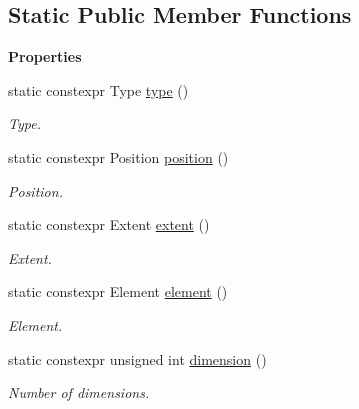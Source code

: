 \subsection*{Static Public Member Functions}
\begin{Indent}{\bf Properties}\par
\begin{DoxyCompactItemize}
\item 
static constexpr Type \hyperlink{exceptionmagrathea_1_1SimpleHyperOctree_a6271ece62c25a4686aedecf0d237df7c}{type} ()
\begin{DoxyCompactList}\small\item\em Type. \end{DoxyCompactList}\item 
static constexpr Position \hyperlink{exceptionmagrathea_1_1SimpleHyperOctree_abe69b54c6a57c71a0b2af0a30027d1a4}{position} ()
\begin{DoxyCompactList}\small\item\em Position. \end{DoxyCompactList}\item 
static constexpr Extent \hyperlink{exceptionmagrathea_1_1SimpleHyperOctree_a626638d67638d26ba680c0452af7c868}{extent} ()
\begin{DoxyCompactList}\small\item\em Extent. \end{DoxyCompactList}\item 
static constexpr Element \hyperlink{exceptionmagrathea_1_1SimpleHyperOctree_aca02f6d7250f58d2da225a11d6a4c197}{element} ()
\begin{DoxyCompactList}\small\item\em Element. \end{DoxyCompactList}\item 
static constexpr unsigned int \hyperlink{exceptionmagrathea_1_1SimpleHyperOctree_a535549fd204b9327e91c853adf3b3750}{dimension} ()
\begin{DoxyCompactList}\small\item\em Number of dimensions. \end{DoxyCompactList}\end{DoxyCompactItemize}
\end{Indent}
